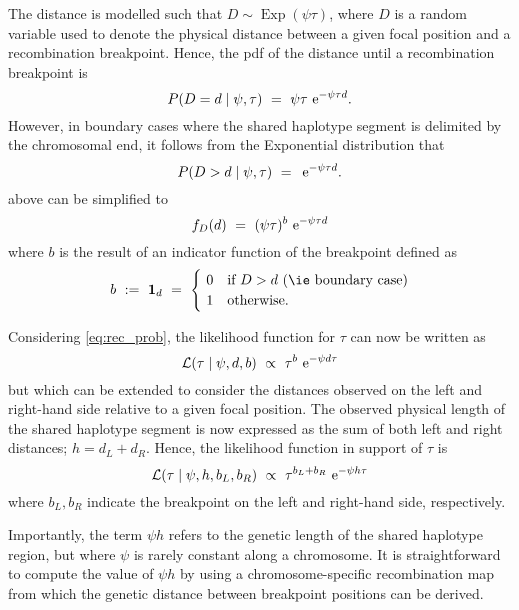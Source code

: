 The distance is modelled such that ${D\sim\operatorname{Exp}(\psi\tau)}$, where $D$ is a random variable used to denote the physical distance between a given focal position and a recombination breakpoint.
Hence, the \gls{pdf} of the distance until a recombination breakpoint is
\begin{equation}\label{eq:rec_prob_brk}
	P(D=d\mid\psi,\tau)~=~\psi\tau \,\,\mathrm{e}^{-\psi\tau d}\text{.}
\end{equation}
However, in boundary cases where the shared haplotype segment is delimited by the chromosomal end, it follows from the Exponential distribution that
\begin{equation}\label{eq:rec_prob_nobrk}
	P(D>d\mid\psi,\tau)~=~\,\mathrm{e}^{-\psi\tau d}\text{.}
\end{equation}
 above can be simplified to
\begin{equation}\label{eq:rec_prob}
	f_D(d)~=~(\psi\tau)^b \,\,\mathrm{e}^{-\psi\tau d}
\end{equation}
where $b$ is the result of an indicator function of the breakpoint defined as
\begin{equation*}
	b~:=~\mathbf{1}_d~=~
	\begin{cases}
    ~ 0 & \text{if}~D>d~\text{(\ie boundary case)} \\
    ~ 1 & \text{otherwise}\text{.}
  \end{cases}
\end{equation*}

Considering \cref{eq:rec_prob}, the likelihood function for $\tau$ can now be written as
\begin{equation}\label{eq:rec_like_x}
	\mathcal{L}(\tau \mid \psi,d,b)~\propto~\tau^b \,\,\mathrm{e}^{-\psi d \tau}
\end{equation}
but which can be extended to consider the distances observed on the left and right-hand side relative to a given focal position.
The observed physical length of the shared haplotype segment is now expressed as the sum of both left and right distances; \ie ${h = d_L + d_R}$.
Hence, the likelihood function in support of $\tau$ is
\begin{equation}\label{eq:rec_like}
	\mathcal{L}(\tau \mid \psi,h,b_L,b_R)~\propto~\tau^{b_L + b_R} \,\,\mathrm{e}^{-\psi h \tau}
\end{equation}
where ${b_L,b_R}$ indicate the breakpoint on the left and right-hand side, respectively.

Importantly, the term ${\psi h}$ refers to the genetic length of the shared haplotype region, but where $\psi$ is rarely constant along a chromosome.
It is straightforward to compute the value of ${\psi h}$ by using a chromosome-specific recombination map from which the genetic distance between breakpoint positions can be derived.

